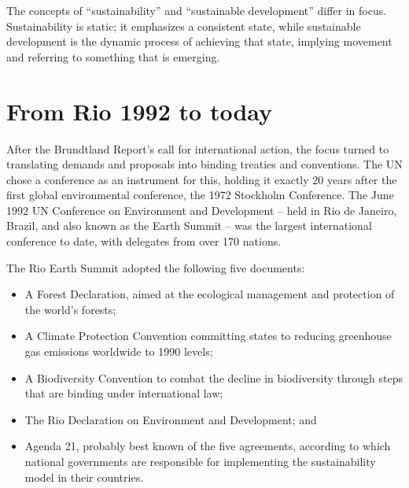 \documentclass[
  a4paper,
  DIV=11,
  numbers=noendperiod,
  oneside,
  openany]{scrreprt}
\providecommand{\tightlist}{%
  \setlength{\itemsep}{0pt}\setlength{\parskip}{0pt}}
\begin{document}
\begin{tcolorbox}[enhanced jigsaw, arc=.35mm, bottomrule=.15mm, bottomtitle=1mm, breakable, colback=white, colbacktitle=quarto-callout-note-color!10!white, colframe=quarto-callout-note-color-frame, coltitle=black, left=2mm, leftrule=.75mm, opacityback=0, opacitybacktitle=0.6, rightrule=.15mm, title={Sustainability and sustainable development}, titlerule=0mm, toprule=.15mm, toptitle=1mm]

The concepts of ``sustainability'' and ``sustainable development''
differ in focus. Sustainability is static; it emphasizes a consistent
state, while sustainable development is the dynamic process of achieving
that state, implying movement and referring to something that is
emerging.

\end{tcolorbox}

\section{From Rio 1992 to today}\label{from-rio-1992-to-today}

After the Brundtland Report's call for international action, the focus
turned to translating demands and proposals into binding treaties and
conventions. The UN chose a conference as an instrument for this,
holding it exactly 20 years after the first global environmental
conference, the 1972 Stockholm Conference. The June 1992 UN Conference
on Environment and Development -- held in Rio de Janeiro, Brazil, and
also known as the Earth Summit -- was the largest international
conference to date, with delegates from over 170 nations.

The Rio Earth Summit adopted the following five documents:

\begin{itemize}
\tightlist
\item
  A Forest Declaration, aimed at the ecological management and
  protection of the world's forests;
\item
  A Climate Protection Convention committing states to reducing
  greenhouse gas emissions worldwide to 1990 levels;
\item
  A Biodiversity Convention to combat the decline in biodiversity
  through steps that are binding under international law;
\item
  The Rio Declaration on Environment and Development; and
\item
  Agenda 21, probably best known of the five agreements, according to
  which national governments are responsible for implementing the
  sustainability model in their countries.
\end{itemize}
\end{document}
